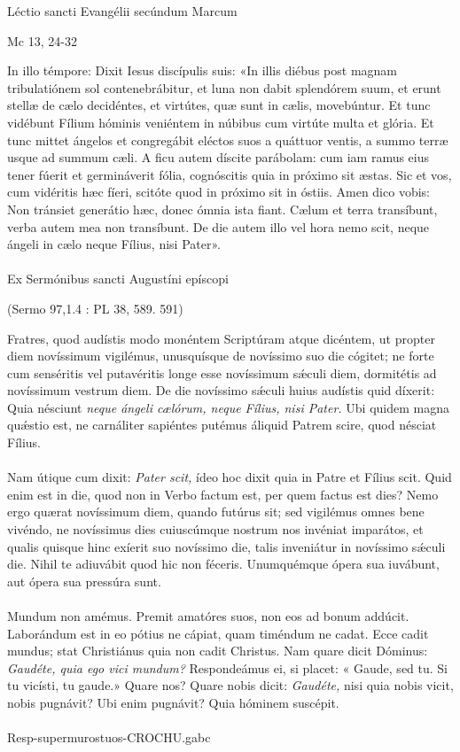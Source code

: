 \documentclass[options]{article}
\begin{document}
	Léctio sancti Evangélii secúndum Marcum 
	\begin{flushright}
		Mc 13, 24-32
	\end{flushright} 
	In illo témpore: Dixit Iesus discípulis suis:
	«In illis diébus post magnam tribulatiónem sol contenebrábitur, et luna non dabit splendórem suum, et erunt stellæ de cælo decidéntes, et virtútes, quæ sunt in cælis, movebúntur.
	Et tunc vidébunt Fílium hóminis veniéntem in núbibus cum virtúte multa et glória. Et tunc mittet ángelos et congregábit eléctos suos a quáttuor ventis, a summo terræ usque ad summum cæli.
	A ficu autem díscite parábolam: cum iam ramus eius tener fúerit et germináverit fólia, cognóscitis quia in próximo sit æstas. Sic et vos, cum vidéritis hæc fíeri, scitóte quod in próximo sit in óstiis.
	Amen dico vobis: Non tránsiet generátio hæc, donec ómnia ista fiant. Cælum et terra transíbunt, verba autem mea non transíbunt. De die autem illo vel hora nemo scit, neque ángeli in cælo neque Fílius, nisi Pater».\\
	\\
	Ex Sermónibus sancti Augustíni epíscopi
	\begin{flushright}
		(Sermo 97,1.4 : PL 38, 589. 591)
	\end{flushright}
Fratres, quod audístis modo monéntem Scriptúram atque dicéntem, ut propter diem novíssimum vigilémus, unusquísque de novíssimo suo die cógitet; ne forte cum senséritis vel putavéritis longe esse novíssimum s\'{æ}culi diem, dormitétis ad novíssimum vestrum diem. De die novíssimo s\'{æ}culi huius audístis quid díxerit: Quia nésciunt \emph{neque ángeli cælórum, neque Fílius, nisi Pater.} Ubi quidem magna qu\'{æ}stio est, ne carnáliter sapiéntes putémus áliquid Patrem scire, quod nésciat Fílius.\\
\\
Nam útique cum dixit: \emph{Pater scit,} ídeo hoc dixit quia in Patre et Fílius scit. Quid enim est in die, quod non in Verbo factum est, per quem factus est dies? Nemo ergo quærat novíssimum diem, quando futúrus sit; sed vigilémus omnes bene vivéndo, ne novíssimus dies cuiuscúmque nostrum nos invéniat imparátos, et qualis quisque hinc exíerit suo novíssimo die, talis inveniátur in novíssimo s\'{æ}culi die. Nihil te adiuvábit quod hic non féceris. Unumquémque ópera sua iuvábunt, aut ópera sua pressúra sunt.\\
\\
Mundum non amémus. Premit amatóres suos, non eos ad bonum addúcit. Laborándum est in eo pótius ne cápiat, quam timéndum ne cadat. Ecce cadit mundus; stat Christiánus quia non cadit Christus. Nam quare dicit Dóminus: \emph{Gaudéte, quia ego vici mundum?} Respondeámus ei, si placet: « Gaude, sed tu. Si tu vicísti, tu gaude.» Quare nos? Quare nobis dicit: \emph{Gaudéte,} nisi quia nobis vicit, nobis pugnávit? Ubi enim pugnávit? Quia hóminem suscépit.\\
\\
Resp-supermurostuos-CROCHU.gabc
\end{document}
